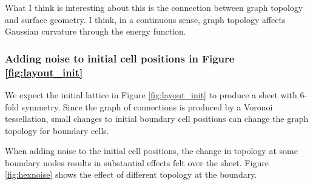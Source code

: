 What I think is interesting about this is the connection between graph topology and surface geometry. I think, in a continuous sense, graph topology affects Gaussian curvature through the energy function. 

\subsubsection{Adding noise to initial cell positions in Figure \ref{fig:layout_init}}

We expect the initial lattice in Figure \ref{fig:layout_init} to produce a sheet with 6-fold symmetry. Since the graph of connections is produced by a Voronoi tessellation, small changes to initial boundary cell positions can change the graph topology for boundary cells. 

When adding noise to the initial cell positions, the change in topology at some boundary nodes results in substantial effects felt over the sheet. Figure \ref{fig:hexnoise} shows the effect of different topology at the boundary.

